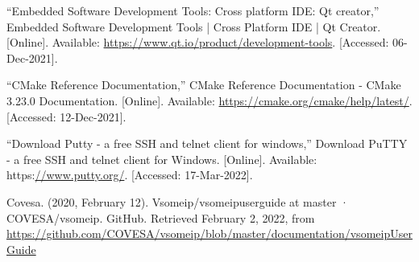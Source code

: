 \documentclass[a4paper, 12pt, oneside, BCOR1cm,toc=chapterentrywithdots]{scrbook}
\begin{document}
\begin{thebibliography}{00}
“Embedded Software Development Tools: Cross platform IDE: Qt creator,” Embedded Software Development Tools | Cross Platform IDE | Qt Creator. [Online]. Available: \url{https://www.qt.io/product/development-tools}. [Accessed: 06-Dec-2021]. 

“CMake Reference Documentation,” CMake Reference Documentation - CMake 3.23.0 Documentation. [Online]. Available: \url{https://cmake.org/cmake/help/latest/}. [Accessed: 12-Dec-2021]. 

“Download Putty - a free SSH and telnet client for windows,” Download PuTTY - a free SSH and telnet client for Windows. [Online]. Available: https:\url{//www.putty.org/}. [Accessed: 17-Mar-2022]. 

Covesa. (2020, February 12). Vsomeip/vsomeipuserguide at master · COVESA/vsomeip. GitHub. Retrieved February 2, 2022, from \url{https://github.com/COVESA/vsomeip/blob/master/documentation/vsomeipUserGuide} 

\end{thebibliography}
\end{document}
